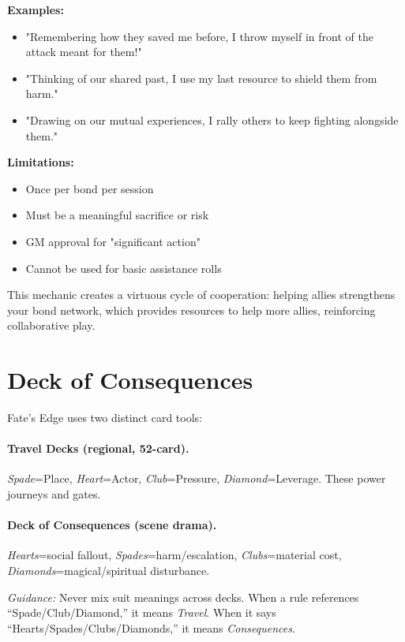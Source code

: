 \textbf{Examples:}
\begin{itemize}
    \item "Remembering how they saved me before, I throw myself in front of the attack meant for them!"
    \item "Thinking of our shared past, I use my last resource to shield them from harm."
    \item "Drawing on our mutual experiences, I rally others to keep fighting alongside them."
\end{itemize}

\textbf{Limitations:}
\begin{itemize}
    \item Once per bond per session
    \item Must be a meaningful sacrifice or risk
    \item GM approval for "significant action"
    \item Cannot be used for basic assistance rolls
\end{itemize}

This mechanic creates a virtuous cycle of cooperation: helping allies strengthens your bond network, which provides resources to help more allies, reinforcing collaborative play.

\section{Deck of Consequences}

Fate's Edge uses two distinct card tools:

\paragraph{Travel Decks (regional, 52-card).}
\emph{Spade}=Place, \emph{Heart}=Actor, \emph{Club}=Pressure, \emph{Diamond}=Leverage. These power journeys and gates.

\paragraph{Deck of Consequences (scene drama).}
\emph{Hearts}=social fallout, \emph{Spades}=harm/escalation, \emph{Clubs}=material cost, \emph{Diamonds}=magical/spiritual disturbance.

\textit{Guidance:} Never mix suit meanings across decks. When a rule references ``Spade/Club/Diamond,'' it means \emph{Travel}. When it says ``Hearts/Spades/Clubs/Diamonds,'' it means \emph{Consequences}.

